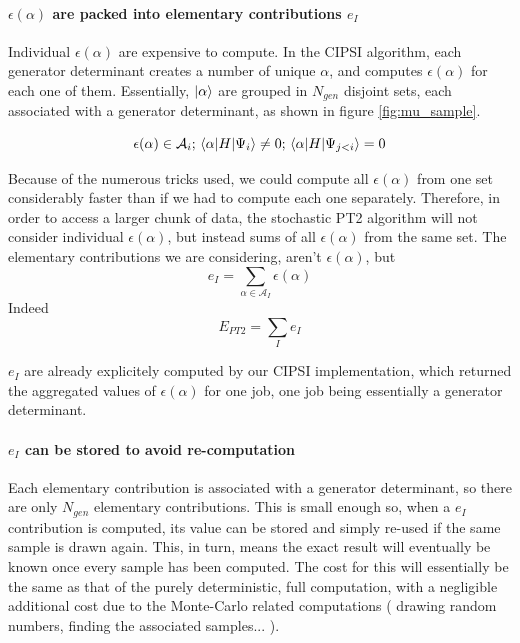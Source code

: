\documentclass[./thesis.tex]{subfiles}
\begin{document}
\paragraph{$\epsilon(\alpha)$ are packed into elementary contributions $e_I$}
Individual $\epsilon(\alpha)$ are expensive to compute. In the CIPSI algorithm, each generator determinant creates a number of unique $\alpha$, and computes $\epsilon(\alpha)$ for each one of them.
Essentially, $\ket \alpha$ are grouped in $N_{gen}$ disjoint sets, each associated with a generator determinant, as shown in figure \ref{fig:mu_sample}.

\begin{equation}
\epsilon(\alpha) \in \mathcal{A}_i ; \mel{\alpha}{H}{\Psi_i} \neq 0 ; \mel{\alpha}{H}{\Psi_{j<i}} =0 
\end{equation}

Because of the numerous tricks used, we could compute all $\epsilon(\alpha)$ from one set considerably faster than if we had to compute each one separately. Therefore, in order to access a larger chunk of data, the stochastic PT2 algorithm will not consider individual $\epsilon(\alpha)$, but instead sums of all $\epsilon(\alpha)$ from the same set.
The elementary contributions we are considering, aren't $\epsilon(\alpha)$, but
\begin{equation}
e_I = \sum_{\alpha \in \mathcal{A}_I} \epsilon(\alpha)
\end{equation}
Indeed
\begin{equation}
E_{PT2} = \sum_{I} e_I
\end{equation}

$e_I$ are already explicitely computed by our CIPSI implementation, which returned the aggregated values of $\epsilon(\alpha)$ for one job, one job being essentially a generator determinant.

\paragraph{$e_I$ can be stored to avoid re-computation}
Each elementary contribution is associated with a generator determinant, so there are only $N_{gen}$ elementary contributions. This is small enough so, when a $e_I$ contribution is computed, its value can be stored and simply re-used if the same sample is drawn again. This, in turn, means the exact result will eventually be known once every sample has been computed. The cost for this will essentially be the same as that of the purely deterministic, full computation, with a negligible additional cost due to the Monte-Carlo related computations ( drawing random numbers, finding the associated samples... ).
\end{document}
